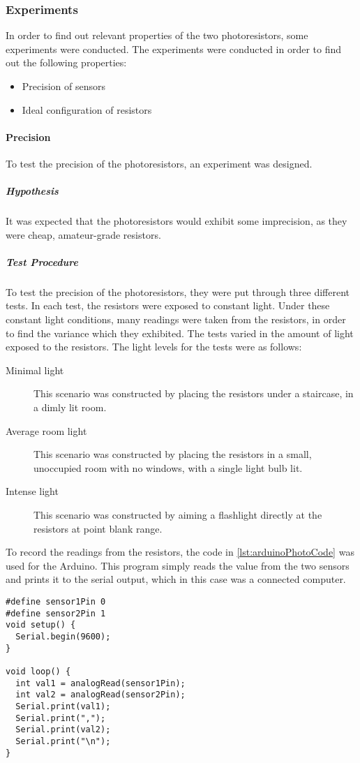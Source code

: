 \subsubsection{Experiments}
In order to find out relevant properties of the two photoresistors, some experiments were conducted. The experiments were conducted in order to find out the following properties:

\begin{itemize}
  \item Precision of sensors
  \item Ideal configuration of resistors
\end{itemize}

\paragraph{Precision}\label{subsub:precision}
To test the precision of the photoresistors, an experiment was designed.
\subparagraph{Hypothesis}
It was expected that the photoresistors would exhibit some imprecision, as they were cheap, amateur-grade resistors.
\subparagraph{Test Procedure}
To test the precision of the photoresistors, they were put through three different tests. In each test, the resistors were exposed to constant light. Under these constant light conditions, many readings were taken from the resistors, in order to find the variance which they exhibited.
The tests varied in the amount of light exposed to the resistors. The light levels for the tests were as follows:

\begin{description}
  \item[Minimal light]
  This scenario was constructed by placing the resistors under a staircase, in a dimly lit room.
  \item[Average room light]
  This scenario was constructed by placing the resistors in a small, unoccupied room with no windows, with a single light bulb lit.
  \item[Intense light]
  This scenario was constructed by aiming a flashlight directly at the resistors at point blank range.
\end{description}

To record the readings from the resistors, the code in \cref{lst:arduinoPhotoCode} was used for the Arduino. This program simply reads the value from the two sensors and prints it to the serial output, which in this case was a connected computer.

\lstset{language=C}
\begin{lstlisting}[label = lst:arduinoPhotoCode, caption = Arduino program for photoresistor tests]
#define sensor1Pin 0
#define sensor2Pin 1
void setup() {
  Serial.begin(9600);
}

void loop() {
  int val1 = analogRead(sensor1Pin);
  int val2 = analogRead(sensor2Pin);
  Serial.print(val1);
  Serial.print(",");
  Serial.print(val2);
  Serial.print("\n");
}
\end{lstlisting}

